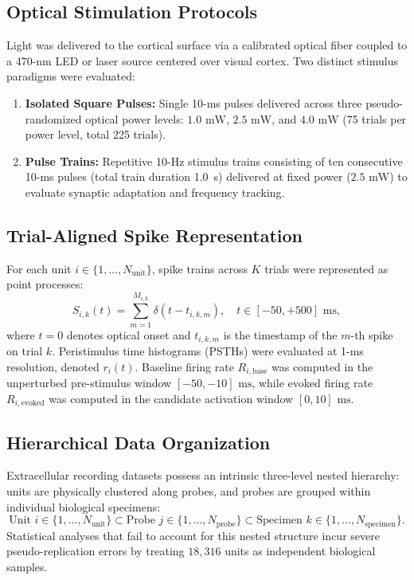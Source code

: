 \documentclass[10pt,journal,compsoc]{IEEEtran}
\begin{document}
\subsection{Optical Stimulation Protocols}
Light was delivered to the cortical surface via a calibrated optical fiber coupled to a 470-nm LED or laser source centered over visual cortex. Two distinct stimulus paradigms were evaluated:
\begin{enumerate}
    \item \textbf{Isolated Square Pulses:} Single 10-ms pulses delivered across three pseudo-randomized optical power levels: $1.0\text{ mW}$, $2.5\text{ mW}$, and $4.0\text{ mW}$ (75 trials per power level, total 225 trials).
    \item \textbf{Pulse Trains:} Repetitive 10-Hz stimulus trains consisting of ten consecutive 10-ms pulses (total train duration 1.0~s) delivered at fixed power ($2.5\text{ mW}$) to evaluate synaptic adaptation and frequency tracking.
\end{enumerate}

\subsection{Trial-Aligned Spike Representation}
For each unit $i \in \{1, \dots, N_{\text{unit}}\}$, spike trains across $K$ trials were represented as point processes:
\begin{equation}
    S_{i,k}(t) = \sum_{m=1}^{M_{i,k}} \delta(t - t_{i,k,m}), \quad t \in [-50, +500]\text{ ms},
\end{equation}
where $t=0$ denotes optical onset and $t_{i,k,m}$ is the timestamp of the $m$-th spike on trial $k$. Peristimulus time histograms (PSTHs) were evaluated at 1-ms resolution, denoted $r_i(t)$. Baseline firing rate $R_{i,\text{base}}$ was computed in the unperturbed pre-stimulus window $[-50, -10]\text{ ms}$, while evoked firing rate $R_{i,\text{evoked}}$ was computed in the candidate activation window $[0, 10]\text{ ms}$.

\subsection{Hierarchical Data Organization}
Extracellular recording datasets possess an intrinsic three-level nested hierarchy: units are physically clustered along probes, and probes are grouped within individual biological specimens:
\begin{equation}
    \text{Unit } i \in \{1, \dots, N_{\text{unit}}\} \subset \text{Probe } j \in \{1, \dots, N_{\text{probe}}\} \subset \text{Specimen } k \in \{1, \dots, N_{\text{specimen}}\}.
\end{equation}
Statistical analyses that fail to account for this nested structure incur severe pseudo-replication errors by treating $18,316$ units as independent biological samples.
\end{document}
